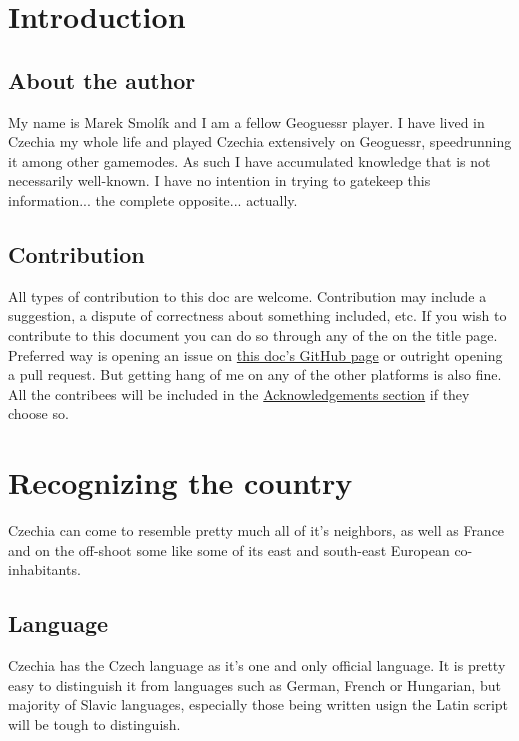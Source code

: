 \documentclass[12pt, oneside]{article}
\begin{document}
\clearpage

\setcounter{page}{1}

\section{Introduction}

\subsection{About the author}

My name is Marek Smolík and I am a fellow Geoguessr player. I have lived in Czechia my whole life and played Czechia extensively on Geoguessr, speedrunning it among other gamemodes. As such I have accumulated knowledge that is not necessarily well-known. I have no intention in trying to gatekeep this information... the complete opposite... actually.

\subsection{Contribution}

All types of contribution to this doc are welcome. Contribution may include a suggestion, a dispute of correctness about something included, etc. If you wish to contribute to this document you can do so through any of the on the title page. Preferred way is opening an issue on \href{https://github.com/dynamo58/geoguessr-czechia-guide}{this doc's GitHub page} or outright opening a pull request. But getting hang of me on any of the other platforms is also fine. All the contribees will be included in the \hyperref[sec:ack]{Acknowledgements section} if they choose so.

\newpage
\section{Recognizing the country}
Czechia can come to resemble pretty much all of it's neighbors, as well as France and on the off-shoot some like some of its east and south-east European co-inhabitants.

\subsection{Language}
Czechia has the Czech language as it's one and only official language. It is pretty easy to distinguish it from languages such as German, French or Hungarian, but majority of Slavic languages, especially those being written usign the Latin script will be tough to distinguish. 
\end{document}
